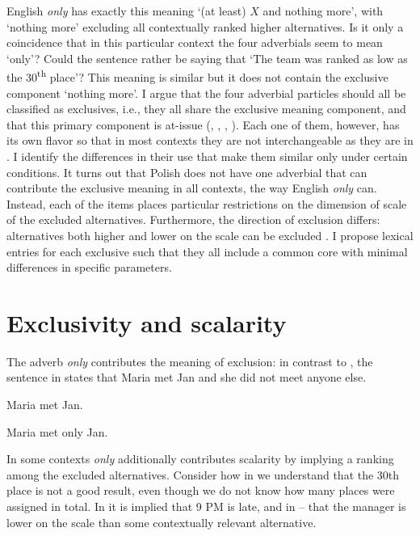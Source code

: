 \documentclass[output=paper,colorlinks,citecolor=brown]{langscibook}
\begin{document}
\noindent %
English \textit{only} has exactly this meaning `(at least) $X$ and nothing more', with `nothing more' excluding all contextually ranked higher alternatives. Is it only a coincidence that in this particular context the four adverbials seem to mean `only'? Could the sentence rather be saying that ‘The team was ranked as low as the 30\textsuperscript{th} place’? This meaning is similar but it does not contain the exclusive component `nothing more'. I argue that the four adverbial particles should all be classified as exclusives, i.e., they all share the exclusive meaning component, and that this primary component is at-issue (\citealt{Potts2005}, \citealt{beaverclark08}, \citealt{Simons.etal2011}, \citealt{roberts11}). Each one of them, however, has its own flavor so that in most contexts they are not interchangeable as they are in . I identify the differences in their use that make them similar only under certain conditions. It turns out that Polish does not have one adverbial that can contribute the exclusive meaning in all contexts, the way %
English \textit{only} can. Instead, each of the items places particular restrictions on the dimension of scale of the excluded alternatives. Furthermore, the direction of exclusion differs: alternatives both higher and lower on the scale can be excluded \citep{tomaszewicz12,tomaszewicz13,tomaszewicz13a}. I propose lexical entries for each exclusive such that they all include a common core with minimal differences in specific parameters.

\section{Exclusivity and scalarity}
\label{sec:tom:2}

The adverb \textit{only} contributes the meaning of exclusion: in contrast to , the sentence in  states that Maria met Jan and she did not meet anyone else. 

\ea\label{ex:tom:2}
Maria met Jan.
\z 

\ea\label{ex:tom:3} 
Maria met only Jan.
\z

\noindent In some contexts \textit{only} additionally contributes scalarity by implying a ranking among the excluded alternatives. Consider how  in  we understand that the 30th place is not a good result, even though we do not know how many places were assigned in total. In  it is implied that 9 PM is late, and in -- that the manager is lower on the scale than some contextually relevant alternative.
\end{document}
